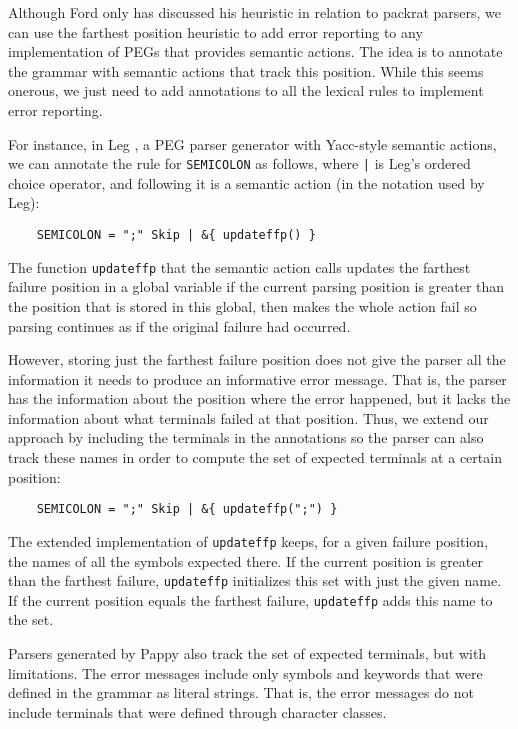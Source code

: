 \documentclass[3p,12pt,singlecolumn]{elsarticle}
\begin{document}
Although Ford only has discussed his heuristic in relation to packrat
parsers, we can use the farthest position heuristic to add error reporting
to any implementation of PEGs that provides semantic actions.
The idea is to annotate the grammar with semantic actions that track
this position. While this seems onerous, we just need to add annotations
to all the lexical rules to implement error reporting.

For instance, in Leg \cite{leg}, a PEG parser generator with
Yacc-style semantic actions, we can annotate the rule for \texttt{SEMICOLON} as follows, where {\tt |} is Leg's ordered choice operator, and following it is a semantic action (in the notation used
by Leg): 
\begin{verbatim}
    SEMICOLON = ";" Skip | &{ updateffp() }
\end{verbatim}

The function \texttt{updateffp} that the semantic action calls updates
the farthest failure position in a global variable if the current
parsing position is greater than the position that is stored in
this global, then makes the whole action fail so parsing continues
as if the original failure had occurred.

However, storing just the farthest failure position does not give
the parser all the information it needs to produce an informative
error message.
That is, the parser has the information about the position where
the error happened, but it lacks the information about what terminals
failed at that position.
Thus, we extend our approach by including the terminals in the annotations
so the parser can also track these names in order to compute the set of
expected terminals at a certain position:

\begin{verbatim}
    SEMICOLON = ";" Skip | &{ updateffp(";") }
\end{verbatim}

The extended implementation of \texttt{updateffp} keeps,
for a given failure position, the names of all the symbols
expected there.
If the current position is greater than the farthest failure,
{\tt updateffp} initializes this set with just the given name.
If the current position equals the farthest failure, {\tt updateffp}
adds this name to the set.

Parsers generated by Pappy also track the set of expected terminals,
but with limitations.
The error messages include only symbols and keywords that were defined
in the grammar as literal strings.
That is, the error messages do not include terminals that were defined
through character classes.
\end{document}
